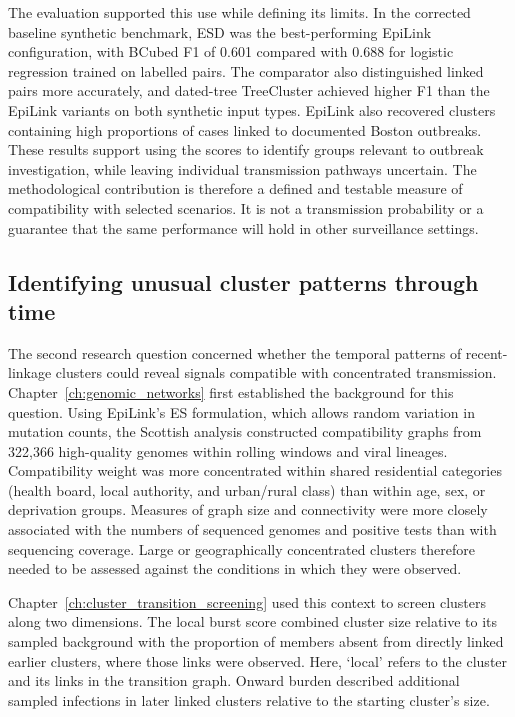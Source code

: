 The evaluation supported this use while defining its limits. In the corrected baseline synthetic benchmark, ESD was the best-performing EpiLink configuration, with BCubed F1 of 0.601 compared with 0.688 for logistic regression trained on labelled pairs. The comparator also distinguished linked pairs more accurately, and dated-tree TreeCluster achieved higher F1 than the EpiLink variants on both synthetic input types. EpiLink also recovered clusters containing high proportions of cases linked to documented Boston outbreaks. These results support using the scores to identify groups relevant to outbreak investigation, while leaving individual transmission pathways uncertain. The methodological contribution is therefore a defined and testable measure of compatibility with selected scenarios. It is not a transmission probability or a guarantee that the same performance will hold in other surveillance settings.

\subsection{Identifying unusual cluster patterns through time}\label{sec:ch7_synthesis_screening}

The second research question concerned whether the temporal patterns of recent-linkage clusters could reveal signals compatible with concentrated transmission. Chapter~\ref{ch:genomic_networks} first established the background for this question. Using EpiLink's ES formulation, which allows random variation in mutation counts, the Scottish analysis constructed compatibility graphs from 322,366 high-quality genomes within rolling windows and viral lineages. Compatibility weight was more concentrated within shared residential categories (health board, local authority, and urban/rural class) than within age, sex, or deprivation groups. Measures of graph size and connectivity were more closely associated with the numbers of sequenced genomes and positive tests than with sequencing coverage. Large or geographically concentrated clusters therefore needed to be assessed against the conditions in which they were observed.

Chapter~\ref{ch:cluster_transition_screening} used this context to screen clusters along two dimensions. The local burst score combined cluster size relative to its sampled background with the proportion of members absent from directly linked earlier clusters, where those links were observed. Here, `local' refers to the cluster and its links in the transition graph. Onward burden described additional sampled infections in later linked clusters relative to the starting cluster's size.

